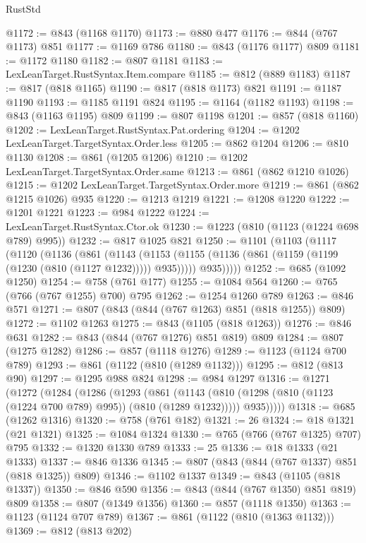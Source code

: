 \begin{lexlean}{RustStd}
\begin{coremodule}
@1172 := @843 (@1168 @1170)
@1173 := @880 @477
@1176 := @844 (@767 @1173) @851
@1177 := @1169 @786
@1180 := @843 (@1176 @1177) @809
@1181 := @1172 @1180
@1182 := @807 @1181
@1183 := LexLeanTarget.RustSyntax.Item.compare
@1185 := @812 (@889 @1183)
@1187 := @817 (@818 @1165)
@1190 := @817 (@818 @1173) @821
@1191 := @1187 @1190
@1193 := @1185 @1191 @824
@1195 := @1164 (@1182 @1193)
@1198 := @843 (@1163 @1195) @809
@1199 := @807 @1198
@1201 := @857 (@818 @1160)
@1202 := LexLeanTarget.RustSyntax.Pat.ordering
@1204 := @1202 LexLeanTarget.TargetSyntax.Order.less
@1205 := @862 @1204
@1206 := @810 @1130
@1208 := @861 (@1205 @1206)
@1210 := @1202 LexLeanTarget.TargetSyntax.Order.same
@1213 := @861 (@862 @1210 @1026)
@1215 := @1202 LexLeanTarget.TargetSyntax.Order.more
@1219 := @861 (@862 @1215 @1026) @935
@1220 := @1213 @1219
@1221 := @1208 @1220
@1222 := @1201 @1221
@1223 := @984 @1222
@1224 := LexLeanTarget.RustSyntax.Ctor.ok
@1230 := @1223 (@810 (@1123 (@1224 @698 @789) @995))
@1232 := @817 @1025 @821
@1250 := @1101
    (@1103
      (@1117
        (@1120
          (@1136
            (@861
              (@1143
                (@1153 (@1155 (@1136 (@861 (@1159 (@1199 (@1230 (@810 (@1127 @1232))))) @935)))))
              @935)))))
@1252 := @685 (@1092 @1250)
@1254 := @758 (@761 @177)
@1255 := @1084 @564
@1260 := @765 (@766 (@767 @1255) @700) @795
@1262 := @1254 @1260 @789
@1263 := @846 @571
@1271 := @807 (@843 (@844 (@767 @1263) @851 (@818 @1255)) @809)
@1272 := @1102 @1263
@1275 := @843 (@1105 (@818 @1263))
@1276 := @846 @631
@1282 := @843 (@844 (@767 @1276) @851 @819) @809
@1284 := @807 (@1275 @1282)
@1286 := @857 (@1118 @1276)
@1289 := @1123 (@1124 @700 @789)
@1293 := @861 (@1122 (@810 (@1289 @1132)))
@1295 := @812 (@813 @90)
@1297 := @1295 @988 @824
@1298 := @984 @1297
@1316 := @1271
    (@1272
      (@1284
        (@1286
          (@1293
            (@861
              (@1143 (@810 (@1298 (@810 (@1123 (@1224 @700 @789) @995)) (@810 (@1289 @1232)))))
              @935)))))
@1318 := @685 (@1262 @1316)
@1320 := @758 (@761 @182)
@1321 := 26
@1324 := @18 @1321 (@21 @1321)
@1325 := @1084 @1324
@1330 := @765 (@766 (@767 @1325) @707) @795
@1332 := @1320 @1330 @789
@1333 := 25
@1336 := @18 @1333 (@21 @1333)
@1337 := @846 @1336
@1345 := @807 (@843 (@844 (@767 @1337) @851 (@818 @1325)) @809)
@1346 := @1102 @1337
@1349 := @843 (@1105 (@818 @1337))
@1350 := @846 @590
@1356 := @843 (@844 (@767 @1350) @851 @819) @809
@1358 := @807 (@1349 @1356)
@1360 := @857 (@1118 @1350)
@1363 := @1123 (@1124 @707 @789)
@1367 := @861 (@1122 (@810 (@1363 @1132)))
@1369 := @812 (@813 @202)

\end{coremodule}
\end{lexlean}

